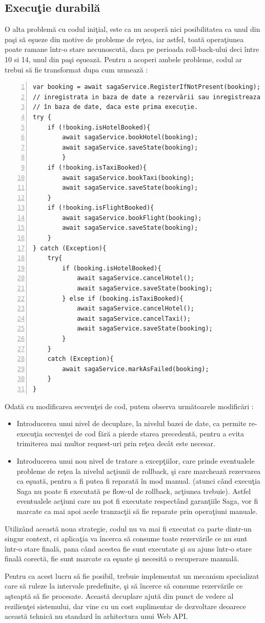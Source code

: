 \subsection{Execuţie durabilă}
\par O alta problemă cu codul iniţial, este ca nu acoperă nici posibilitatea ca unul din paşi să eşueze din motive de probleme de reţea, iar astfel, toată operaţiunea poate ramane într-o stare necunoscută, daca pe perioada roll-back-ului deci între 10 si 14, unul din paşi eşuează. Pentru a acoperi ambele probleme, codul ar trebui să fie transformat dupa cum urmează : 
\begin{Verbatim}[numbers=left]
var booking = await sagaService.RegisterIfNotPresent(booking); // returneaza starea 
// inregistrata in baza de date a rezervării sau inregistreaza rezervarea 
// în baza de date, daca este prima execuţie.
try {
	if (!booking.isHotelBooked){
		await sagaService.bookHotel(booking);
		await sagaService.saveState(booking);
		}
	if (!booking.isTaxiBooked){
		await sagaService.bookTaxi(booking);
		await sagaService.saveState(booking);
	}
	if (!booking.isFlightBooked){
		await sagaService.bookFlight(booking);
		await sagaService.saveState(booking);
	}
} catch (Exception){
	try{
		if (booking.isHotelBooked){
			await sagaService.cancelHotel();
			await sagaService.saveState(booking);
		} else if (booking.isTaxiBooked){
			await sagaService.cancelHotel();
			await sagaService.cancelTaxi();
			await sagaService.saveState(booking);
		}
	}
	catch (Exception){
		await sagaService.markAsFailed(booking);
	}
}
\end{Verbatim}
Odată cu modificarea secvenţei de cod, putem observa următoarele modificări :
\begin{itemize}
\item Introducerea unui nivel de decuplare, la nivelul bazei de date, ca permite re-execuţia secvenţei de cod fără a pierde starea precedentă, pentru a evita trimiterea mai multor request-uri prin reţea decât este necesar. 
\item Introducerea unui nou nivel de tratare a excepţiilor, care prinde eventualele probleme de reţea la nivelul acţiunii de rollback, şi care marchează rezervarea ca eşuată, pentru a fi putea fi reparată în mod manual. (atunci când execuţia Saga nu poate fi executată pe flow-ul de rollback, acţiunea trebuie). Astfel eventualele acţiuni care nu pot fi executate respectând garanţiile Saga, vor fi marcate ca mai apoi acele tranzacţii să fie reparate prin operaţiuni manuale. 
\end{itemize} 
Utilizând această noua strategie, codul nu va mai fi executat ca parte dintr-un singur context, ci aplicaţia va încerca să consume toate rezervările ce nu sunt într-o stare finală, pana când acestea fie sunt executate şi au ajuns într-o stare finală corectă, fie sunt marcate ca eşuate şi necesită o recuperare manuală.
\par Pentru ca acest lucru să fie posibil, trebuie implementat un mecanism specializat care să ruleze la intervale predefinite, şi să încerce să consume rezervările ce aşteaptă să fie procesate. Această decuplare ajută din punct de vedere al rezilienţei sistemului, dar vine cu un cost suplimentar de dezvoltare deoarece această tehnică nu standard în arhitectura unui Web API.  
